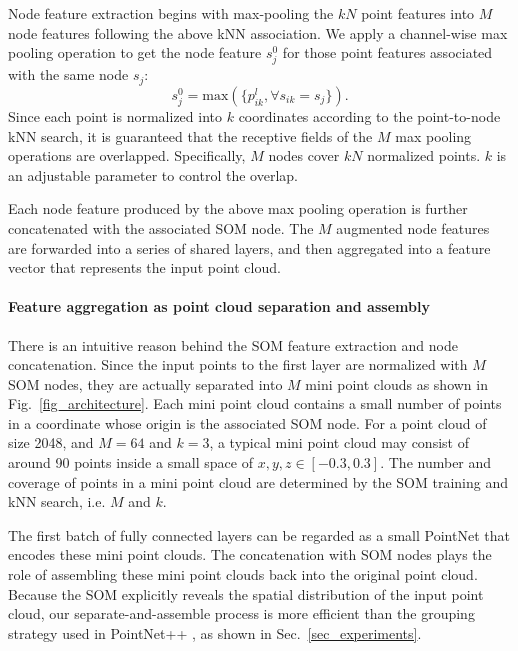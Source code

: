 \documentclass[10pt,twocolumn,letterpaper]{article}
\begin{document}
%
Node feature extraction begins with max-pooling the $kN$ point features into $M$ node features following the above kNN association. We apply a channel-wise max pooling operation to get the node feature $s_j^0$ for those point features associated with the same node $s_j$:
%
\begin{equation} \label{equ_som_pool}
    s_j^0 = \text{max}(\{p_{ik}^l, \forall s_{ik}=s_j\}).
\end{equation}
%
Since each point is normalized into $k$ coordinates according to the point-to-node kNN search, it is guaranteed that the receptive fields of the $M$ max pooling operations are overlapped. Specifically, $M$ nodes cover $kN$ normalized points. $k$ is an adjustable parameter to control the overlap. 

Each node feature produced by the above max pooling operation is further concatenated with the associated SOM node. The $M$ augmented node features are forwarded into a series of shared layers, and then aggregated into a feature vector that represents the input point cloud.

\paragraph{Feature aggregation as point cloud separation and assembly}
There is an intuitive reason behind the SOM feature extraction and node concatenation. Since the input points to the first layer are normalized with $M$ SOM nodes, they are actually separated into $M$ mini point clouds as shown in Fig.~\ref{fig_architecture}. Each mini point cloud contains a small number of points in a coordinate whose origin is the associated SOM node. For a point cloud of size 2048, and $M=64$ and $k=3$, a typical mini point cloud may consist of around 90 points inside a small space of $x,y,z\in[-0.3, 0.3]$. The number and coverage of points in a mini point cloud are determined by the SOM training and kNN search, i.e. $M$ and $k$. 

The first batch of fully connected layers can be regarded as a small PointNet that encodes these mini point clouds. The concatenation with SOM nodes plays the role of assembling these mini point clouds back into the original point cloud. Because the SOM explicitly reveals the spatial distribution of the input point cloud, our separate-and-assemble process is more efficient than the grouping strategy used in PointNet++ \cite{qi2017pointnet++}, as shown in Sec.~\ref{sec_experiments}.
\end{document}
